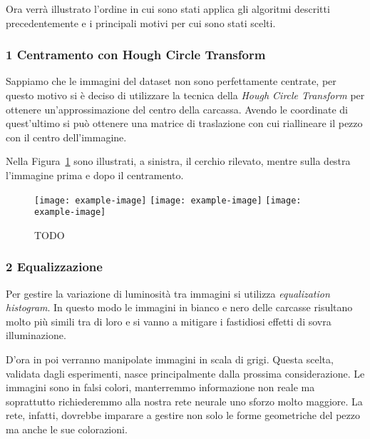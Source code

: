 \clearpage
Ora verrà illustrato l'ordine in cui sono stati applica gli algoritmi descritti precedentemente e i principali motivi per cui sono stati scelti.

\subsubsection{1 Centramento con Hough Circle Transform}
Sappiamo che le immagini del dataset non sono perfettamente centrate, per questo motivo si è deciso di utilizzare la tecnica della \textit{Hough Circle Transform} per ottenere un'approssimazione del centro della carcassa.
Avendo le coordinate di quest'ultimo si può ottenere una matrice di traslazione con cui riallineare il pezzo con il centro dell'immagine.

Nella Figura~\ref{fig:centramento} sono illustrati, a sinistra, il cerchio rilevato, mentre sulla destra l'immagine prima e dopo il centramento.
\begin{figure}[ht] %
  \begin{center}
    \texttt{[image: example-image]}
    \texttt{[image: example-image]}
    \texttt{[image: example-image]}
    \label{fig:centramento}
    \caption{TODO }
  \end{center}
\end{figure}

\subsubsection{2 Equalizzazione}
Per gestire la variazione di luminosità tra immagini si utilizza \textit{equalization histogram}.
In questo modo le immagini in bianco e nero delle carcasse risultano molto più simili tra di loro e si vanno a mitigare i fastidiosi effetti di sovra illuminazione.

D'ora in poi verranno manipolate immagini in scala di grigi.
Questa scelta, validata dagli esperimenti, nasce principalmente dalla prossima considerazione.
Le immagini sono in falsi colori, manterremmo informazione non reale ma soprattutto richiederemmo alla nostra rete neurale uno sforzo molto maggiore.
La rete, infatti, dovrebbe imparare a gestire non solo le forme geometriche del pezzo ma anche le sue colorazioni.

